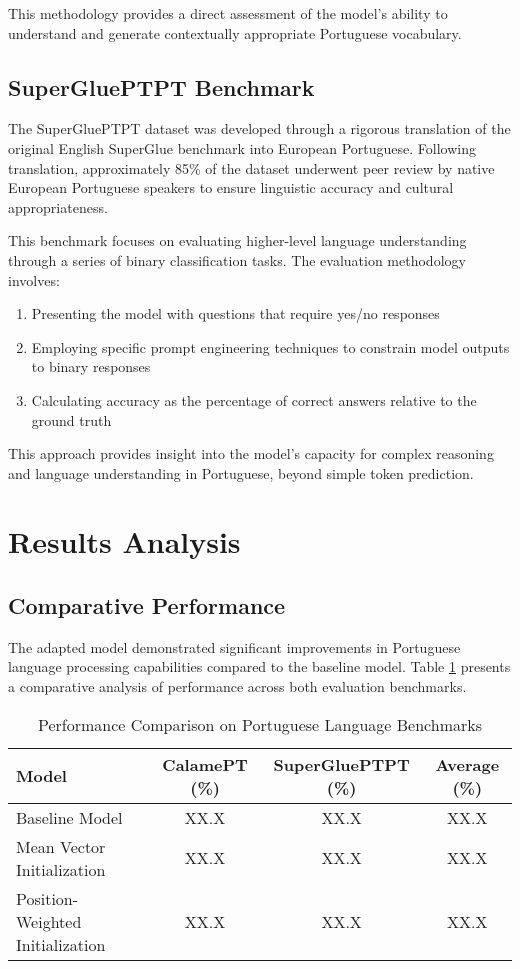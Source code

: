 This methodology provides a direct assessment of the model's ability to understand and generate contextually appropriate Portuguese vocabulary.

\subsection{SuperGluePTPT Benchmark}
The SuperGluePTPT dataset was developed through a rigorous translation of the original English SuperGlue benchmark \cite{wang2019superglue} into European Portuguese. Following translation, approximately 85\% of the dataset underwent peer review by native European Portuguese speakers to ensure linguistic accuracy and cultural appropriateness.

This benchmark focuses on evaluating higher-level language understanding through a series of binary classification tasks. The evaluation methodology involves:

\begin{enumerate}
    \item Presenting the model with questions that require yes/no responses
    \item Employing specific prompt engineering techniques to constrain model outputs to binary responses
    \item Calculating accuracy as the percentage of correct answers relative to the ground truth
\end{enumerate}

This approach provides insight into the model's capacity for complex reasoning and language understanding in Portuguese, beyond simple token prediction.

\section{Results Analysis}
\subsection{Comparative Performance}
The adapted model demonstrated significant improvements in Portuguese language processing capabilities compared to the baseline model. Table \ref{tab:benchmark_results} presents a comparative analysis of performance across both evaluation benchmarks.

\begin{table}[h]
\centering
\caption{Performance Comparison on Portuguese Language Benchmarks}
\label{tab:benchmark_results}
\begin{tabular}{lccc}
\hline
\textbf{Model} & \textbf{CalamePT (\%)} & \textbf{SuperGluePTPT (\%)} & \textbf{Average (\%)} \\
\hline
Baseline Model & XX.X & XX.X & XX.X \\
Mean Vector Initialization & XX.X & XX.X & XX.X \\
Position-Weighted Initialization & XX.X & XX.X & XX.X \\
\hline
\end{tabular}
\end{table}

